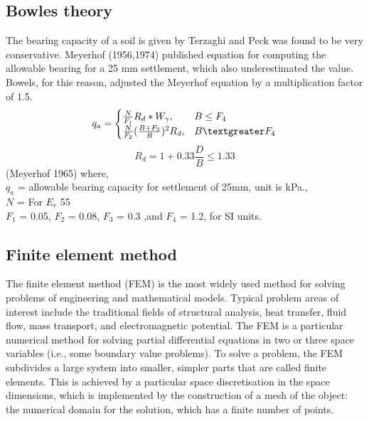 \subsection{Bowles theory}
The bearing capacity of a soil is given by Terzaghi and Peck was found to be very conservative. Meyerhof (1956,1974) published equation for computing the allowable bearing for a 25 mm settlement, which also underestimated the value. Bowels, for this reason, adjusted the Meyerhof equation by a multiplication factor of 1.5.
\begin{equation}
q_a = \begin{cases}
			\frac{N}{F_1} R_d * W_\gamma, & B \le F_4 \\
			\frac{N}{F_2}(\frac{B+F_3}{B})^2 R_d, & B \textgreater F_4
		\end{cases}
\end{equation}
\begin{equation}
R_d = 1 + 0.33 \frac{D}{B} \le 1.33 
\end{equation} (Meyerhof 1965)
where,\\
$q_a$  = allowable bearing capacity for settlement of 25mm, unit is kPa.,\\
$N$ = For $E_r$ 55\\
$F_1$ = 0.05, $F_2$ = 0.08, $F_3$ = 0.3 ,and $F_4$ = 1.2, for SI units.

\subsection{Finite element method}
The finite element method (FEM) is the most widely used method for solving problems of engineering and mathematical models. Typical problem areas of interest include the traditional fields of structural analysis, heat transfer, fluid flow, mass transport, and electromagnetic potential. The FEM is a particular numerical method for solving partial differential equations in two or three space variables (i.e., some boundary value problems). To solve a problem, the FEM subdivides a large system into smaller, simpler parts that are called finite elements. This is achieved by a particular space discretisation in the space dimensions, which is implemented by the construction of a mesh of the object: the numerical domain for the solution, which has a finite number of points. 
